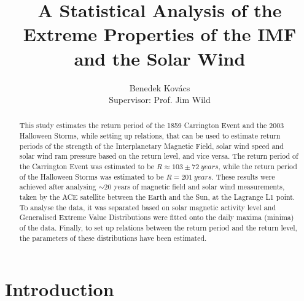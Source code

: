 \documentclass[12pt]{article}
\title{\vspace{-1em}A Statistical Analysis of the Extreme Properties of the IMF and the Solar Wind}
\author{Benedek Kovács\\ Supervisor: Prof. Jim Wild}
\date{}
\begin{document}
\maketitle
\begin{center}
\end{center}
\bigskip
\begin{abstract}
    \noindent This study estimates the return period of the 1859 Carrington Event and the 2003 Halloween Storms, while setting up relations, that can be used to estimate return periods of the strength of the Interplanetary Magnetic Field, solar wind speed and solar wind ram pressure based on the return level, and vice versa. The return period of the Carrington Event was estimated to be $R\approx 103\pm72\ years$, while the return period of the Halloween Storms was estimated to be $R=201\ years$. These results were achieved after analysing $\sim 20$ years of magnetic field and solar wind measurements, taken by the ACE satellite between the Earth and the Sun, at the Lagrange L1 point. To analyse the data, it was separated based on solar magnetic activity level and Generalised Extreme Value Distributions were fitted onto the daily maxima (minima) of the data. Finally, to set up relations between the return period and the return level, the parameters of these distributions have been estimated.
\end{abstract}
\newpage
\restoregeometry
\tableofcontents
\newpage
\pagestyle{fancy}
\fancyhf{}
\lhead{\leftmark}
\cfoot{\thepage}

\section{Introduction}\label{sec:introduction}
\end{document}
